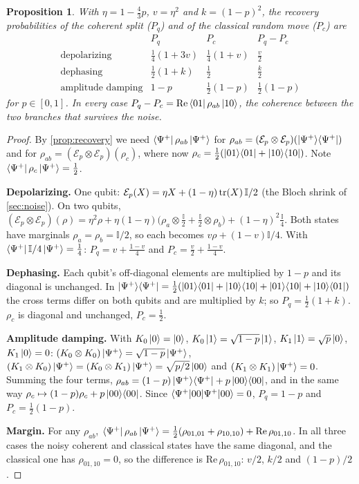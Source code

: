 \documentclass[11pt,a4paper]{article}
\newtheorem{proposition}{Proposition}
\begin{document}
\begin{proposition}\label{prop:chessnoise}
With $\eta=1-\frac43p$, $v=\eta^2$ and $k=(1-p)^2$, the recovery probabilities of the coherent split ($P_q$) and of the classical random move ($P_c$) are
\[
\begin{array}{lccc}
 & P_q & P_c & P_q-P_c\\[2pt]
\text{depolarizing} & \frac14(1+3v) & \frac14(1+v) & \frac v2\\[2pt]
\text{dephasing} & \frac12(1+k) & \frac12 & \frac k2\\[2pt]
\text{amplitude damping} & 1-p & \frac12(1-p) & \frac12(1-p)
\end{array}
\]
for $p\in[0,1]$. In every case $P_q-P_c=\mathrm{Re}\bra{01}\rho_{ab}\ket{10}$, the coherence between the two branches that survives the noise.
\end{proposition}
\begin{proof}
By \cref{prop:recovery} we need $\bra{\Psi^+}\rho_{ab}\ket{\Psi^+}$ for $\rho_{ab}=(\mathcal E_p\otimes\mathcal E_p)(\ket{\Psi^+}\!\bra{\Psi^+})$ and for $\rho_{ab}=(\mathcal E_p\otimes\mathcal E_p)(\rho_c)$, where now $\rho_c=\frac12(\ket{01}\!\bra{01}+\ket{10}\!\bra{10})$. Note $\bra{\Psi^+}\rho_c\ket{\Psi^+}=\frac12$.

\textbf{Depolarizing.} One qubit: $\mathcal E_p(X)=\eta X+(1-\eta)\tr(X)\,\mathbb I/2$ (the Bloch shrink of \cref{sec:noise}). On two qubits, $(\mathcal E_p\otimes\mathcal E_p)(\rho)=\eta^2\rho+\eta(1-\eta)\big(\rho_a\otimes\frac{\mathbb I}2+\frac{\mathbb I}2\otimes\rho_b\big)+(1-\eta)^2\frac{\mathbb I}4$. Both states have marginals $\rho_a=\rho_b=\mathbb I/2$, so each becomes $v\rho+(1-v)\mathbb I/4$. With $\bra{\Psi^+}\mathbb I/4\ket{\Psi^+}=\frac14$: $P_q=v+\frac{1-v}4$ and $P_c=\frac v2+\frac{1-v}4$.

\textbf{Dephasing.} Each qubit's off-diagonal elements are multiplied by $1-p$ and its diagonal is unchanged. In $\ket{\Psi^+}\!\bra{\Psi^+}=\frac12(\ket{01}\!\bra{01}+\ket{10}\!\bra{10}+\ket{01}\!\bra{10}+\ket{10}\!\bra{01})$ the cross terms differ on both qubits and are multiplied by $k$; so $P_q=\frac12(1+k)$. $\rho_c$ is diagonal and unchanged, $P_c=\frac12$.

\textbf{Amplitude damping.} With $K_0\ket0=\ket0$, $K_0\ket1=\sqrt{1-p}\ket1$, $K_1\ket1=\sqrt p\ket0$, $K_1\ket0=0$: $(K_0\otimes K_0)\ket{\Psi^+}=\sqrt{1-p}\ket{\Psi^+}$, $(K_1\otimes K_0)\ket{\Psi^+}=(K_0\otimes K_1)\ket{\Psi^+}=\sqrt{p/2}\ket{00}$ and $(K_1\otimes K_1)\ket{\Psi^+}=0$. Summing the four terms, $\rho_{ab}=(1-p)\ket{\Psi^+}\!\bra{\Psi^+}+p\ket{00}\!\bra{00}$, and in the same way $\rho_c\mapsto(1-p)\rho_c+p\ket{00}\!\bra{00}$. Since $\braket{\Psi^+|00}=0$, $P_q=1-p$ and $P_c=\frac12(1-p)$.

\textbf{Margin.} For any $\rho_{ab}$, $\bra{\Psi^+}\rho_{ab}\ket{\Psi^+}=\frac12(\rho_{01,01}+\rho_{10,10})+\mathrm{Re}\,\rho_{01,10}$. In all three cases the noisy coherent and classical states have the same diagonal, and the classical one has $\rho_{01,10}=0$, so the difference is $\mathrm{Re}\,\rho_{01,10}$: $v/2$, $k/2$ and $(1-p)/2$.
\end{proof}
\end{document}
